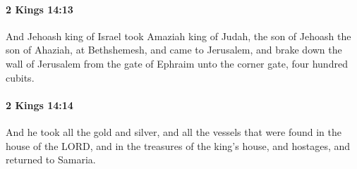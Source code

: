 		\paragraph{2 Kings 14:13} %
			\label{2KINGS-14-13}

			And Jehoash king of Israel took Amaziah king of Judah, the son of Jehoash the son of Ahaziah, at Bethshemesh, and came to Jerusalem, and brake down the wall of Jerusalem from the gate of Ephraim unto the corner gate, four hundred cubits.


		\paragraph{2 Kings 14:14} %
			\label{2KINGS-14-14}

			And he took all the gold and silver, and all the vessels that were found in the house of the LORD, and in the treasures of the king’s house, and hostages, and returned to Samaria.

